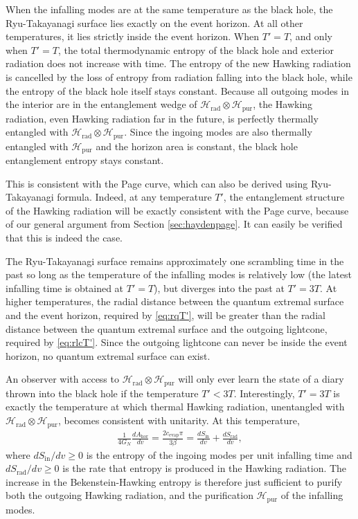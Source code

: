 \documentclass[11pt,a4paper]{article}
\newcommand{\Srad}{S_\text{rad} }
\begin{document}
When the infalling modes are at the same temperature as the black hole, the Ryu-Takayanagi surface lies exactly on the event horizon. At all other temperatures, it lies strictly inside the event horizon. When $T'=T$, and only when $T' = T$, the total thermodynamic entropy of the black hole and exterior radiation does not increase with time. The entropy of the new Hawking radiation is cancelled by the loss of entropy from radiation falling into the black hole, while the entropy of the black hole itself stays constant. Because all outgoing modes in the interior are in the entanglement wedge of $\mathcal{H}_\text{rad} \otimes \mathcal{H}_\text{pur}$, the Hawking radiation, even Hawking radiation far in the future, is perfectly thermally entangled with $\mathcal{H}_\text{rad} \otimes \mathcal{H}_\text{pur}$. Since the ingoing modes are also thermally entangled with $\mathcal{H}_\text{pur}$ and the horizon area is constant, the black hole entanglement entropy stays constant. 

This is consistent with the Page curve, which can also be derived using Ryu-Takayanagi formula. Indeed, at any temperature $T'$, the entanglement structure of the Hawking radiation will be exactly consistent with the Page curve, because of our general argument from Section \ref{sec:haydenpage}. It can easily be verified that this is indeed the case.

The Ryu-Takayanagi surface remains approximately one scrambling time in the past so long as the temperature of the infalling modes is relatively low (the latest infalling time is obtained at $T'=T$), but diverges into the past at $T' = 3T$. At higher temperatures, the radial distance between the quantum extremal surface and the event horizon, required by \eqref{eq:rqT'}, will be greater than the radial distance between the quantum extremal surface and the outgoing lightcone, required by \eqref{eq:rlcT'}. Since the outgoing lightcone can never be inside the event horizon, no quantum extremal surface can exist.

An observer with access to $\mathcal{H}_\text{rad} \otimes \mathcal{H}_\text{pur}$ will only ever learn the state of a diary thrown into the black hole if the temperature $T' < 3T$. Interestingly, $T'  = 3 T$ is exactly the temperature at which thermal Hawking radiation, unentangled with $\mathcal{H}_\text{rad} \otimes \mathcal{H}_\text{pur}$, becomes consistent with unitarity. At this temperature,
\begin{align} \label{eq:etaentropyincrease}
\frac{1}{4 G_N} \frac{d A_\text{hor}}{d v} = \frac{2 c_\text{evap} \pi}{3 \beta} =   \frac{d S_\text{in}}{d v} +\frac{d \Srad}{d v},
\end{align}
where $d S_\text{in}/d v \geq 0$ is the entropy of the ingoing modes per unit infalling time and $d \Srad/d v \geq 0$ is the rate that entropy is produced in the Hawking radiation. The increase in the Bekenstein-Hawking entropy is therefore just sufficient to purify both the outgoing Hawking radiation, and the purification $\mathcal{H}_\text{pur}$ of the infalling modes.
\end{document}
